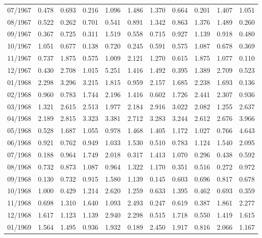 \begin{tabular}{lrrrrrrrrrr}
07/1967 &  0.478 &  0.693 &  0.216 &  1.096 &  1.486 &  1.370 &  0.664 &  0.201 &  1.407 &  1.051 \\
08/1967 &  0.522 &  0.262 &  0.701 &  0.541 &  0.891 &  1.342 &  0.863 &  1.376 &  1.489 &  0.260 \\
09/1967 &  0.367 &  0.725 &  0.311 &  1.519 &  0.558 &  0.715 &  0.927 &  1.139 &  0.918 &  0.480 \\
10/1967 &  1.051 &  0.677 &  0.138 &  0.720 &  0.245 &  0.591 &  0.575 &  1.087 &  0.678 &  0.369 \\
11/1967 &  0.737 &  1.875 &  0.575 &  1.009 &  2.121 &  1.270 &  0.615 &  1.875 &  1.077 &  0.110 \\
12/1967 &  0.430 &  2.708 &  1.015 &  5.251 &  1.416 &  1.492 &  0.395 &  1.389 &  2.709 &  0.523 \\
01/1968 &  2.298 &  3.296 &  3.215 &  1.815 &  0.959 &  2.157 &  1.685 &  2.238 &  1.693 &  0.136 \\
02/1968 &  0.960 &  0.783 &  1.744 &  2.196 &  1.416 &  0.602 &  1.726 &  2.441 &  2.307 &  0.936 \\
03/1968 &  1.321 &  2.615 &  2.513 &  1.977 &  2.184 &  2.916 &  3.022 &  2.082 &  1.255 &  2.637 \\
04/1968 &  2.189 &  2.815 &  3.323 &  3.381 &  2.712 &  3.283 &  3.244 &  2.612 &  2.676 &  3.966 \\
05/1968 &  0.528 &  1.687 &  1.055 &  0.978 &  1.468 &  1.405 &  1.172 &  1.027 &  0.766 &  4.643 \\
06/1968 &  0.921 &  0.762 &  0.949 &  1.033 &  1.530 &  0.510 &  0.783 &  1.124 &  1.540 &  2.095 \\
07/1968 &  0.188 &  0.964 &  1.749 &  2.018 &  0.317 &  1.413 &  1.070 &  0.296 &  0.438 &  0.592 \\
08/1968 &  0.732 &  0.873 &  1.087 &  0.964 &  1.322 &  1.170 &  0.351 &  0.516 &  0.272 &  0.972 \\
09/1968 &  0.130 &  0.732 &  0.915 &  1.580 &  1.139 &  0.145 &  0.603 &  0.696 &  0.817 &  0.678 \\
10/1968 &  1.000 &  0.429 &  1.214 &  2.620 &  1.259 &  0.633 &  1.395 &  0.462 &  0.693 &  0.359 \\
11/1968 &  0.698 &  1.310 &  1.640 &  1.093 &  2.493 &  0.247 &  0.619 &  0.387 &  1.861 &  2.277 \\
12/1968 &  1.617 &  1.123 &  1.139 &  2.940 &  2.298 &  0.515 &  1.718 &  0.550 &  1.419 &  1.615 \\
01/1969 &  1.564 &  1.495 &  0.936 &  1.932 &  0.189 &  2.450 &  1.917 &  0.816 &  2.066 &  1.167 \\

\end{tabular}
